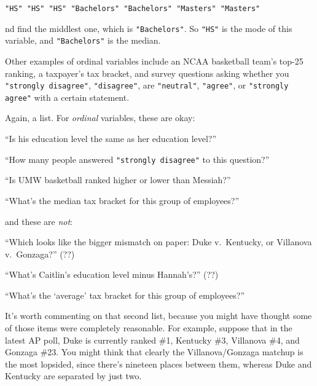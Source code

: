 \begin{center}
\texttt{"HS"  "HS"  "HS"  "Bachelors"  "Bachelors"  "Masters"  "Masters"}
\end{center}

nd find the middlest one, which is \texttt{"Bachelors"}. So \texttt{"HS"} is
the mode of this variable, and \texttt{"Bachelors"} is the median.

Other examples of ordinal variables include an NCAA basketball team's top-25
ranking, a taxpayer's tax bracket, and survey questions asking whether you
\texttt{"strongly disagree"}, \texttt{"disagree"}, are \texttt{"neutral"},
\texttt{"agree"}, or \texttt{"strongly agree"} with a certain statement.

Again, a list. For \textit{ordinal} variables, these are okay:

\begin{compactitem}
\item[\leftthumbsup] ``Is his education level the same as her education level?''
\item[\leftthumbsup] ``How many people answered \texttt{"strongly disagree"} to
this question?''
\item[\leftthumbsup] ``Is UMW basketball ranked higher or lower than Messiah?''
\item[\leftthumbsup] ``What's the median tax bracket for this group of
employees?''
\end{compactitem}

and these are \textit{not}:

\begin{compactitem}
\item[\leftthumbsdown] ``Which looks like the bigger mismatch on paper: Duke
v.~Kentucky, or Villanova v.~Gonzaga?'' (??)
\item[\leftthumbsdown] ``What's Caitlin's education level minus Hannah's?'' (??)
\item[\leftthumbsdown] ``What's the `average' tax bracket for this group of
employees?''
\end{compactitem}

It's worth commenting on that second list, because you might have thought some
of those items were completely reasonable. For example, suppose that in the
latest AP poll, Duke is currently ranked \#1, Kentucky \#3, Villanova \#4, and
Gonzaga \#23. You might think that clearly the Villanova/Gonzaga matchup is the
most lopsided, since there's nineteen places between them, whereas Duke and
Kentucky are separated by just two.

